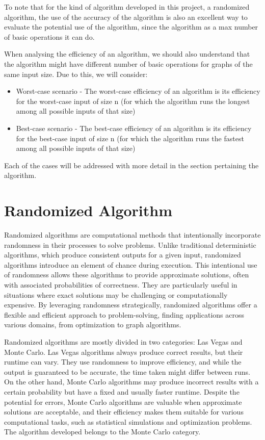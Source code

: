 \documentclass[]{revdetua}
\begin{document}
To note that for the kind of algorithm developed in this project, a randomized algorithm, the use of the accuracy of the algorithm is also an excellent way to evaluate the potential use of the algorithm, since the algorithm as a max number of basic operations it can do. 

When analysing the efficiency of an algorithm, we should also understand that the algorithm might have different number of basic operations for graphs of the same input size. Due to this, we will consider:

\begin{itemize}
    \item Worst-case scenario - The worst-case efficiency of an algorithm is its efficiency for the worst-case input of size n (for which the algorithm runs the longest among all possible inputs of that size)
    \item Best-case scenario - The best-case efficiency of an algorithm is its efficiency for the best-case input of size n (for which the algorithm runs the fastest among all possible inputs of that size)
\end{itemize}

Each of the cases will be addressed with more detail in the section pertaining the algorithm.

\section{Randomized Algorithm}

Randomized algorithms are computational methods that intentionally incorporate randomness in their processes to solve problems. Unlike traditional deterministic algorithms, which produce consistent outputs for a given input, randomized algorithms introduce an element of chance during execution. This intentional use of randomness allows these algorithms to provide approximate solutions, often with associated probabilities of correctness. They are particularly useful in situations where exact solutions may be challenging or computationally expensive. By leveraging randomness strategically, randomized algorithms offer a flexible and efficient approach to problem-solving, finding applications across various domains, from optimization to graph algorithms.

Randomized algorithms are mostly divided in two categories: Las Vegas and Monte Carlo. Las Vegas algorithms always produce correct results, but their runtime can vary. They use randomness to improve efficiency, and while the output is guaranteed to be accurate, the time taken might differ between runs. On the other hand, Monte Carlo algorithms may produce incorrect results with a certain probability but have a fixed and usually faster runtime. Despite the potential for errors, Monte Carlo algorithms are valuable when approximate solutions are acceptable, and their efficiency makes them suitable for various computational tasks, such as statistical simulations and optimization problems. The algorithm developed belongs to the Monte Carlo category.
\end{document}
